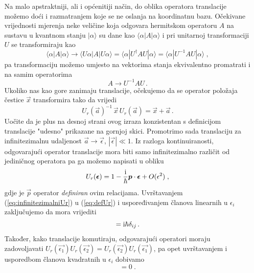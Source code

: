 Na malo apstraktniji, ali i općenitiji način, do oblika operatora translacije
možemo doći i razmatranjem koje se ne oslanja na koordinatnu bazu.
Očekivane vrijednosti mjerenja neke veličine koja odgovara hermitskom operatoru $A$
na sustavu u kvantnom stanju $|\alpha\rangle$ 
su dane kao $\langle \alpha | A | \alpha \rangle$ i pri unitarnoj transformaciji $U$
se transformiraju kao 
\begin{equation}
    \langle \alpha | A | \alpha \rangle \to
    \langle U \alpha | A | U \alpha \rangle =
    \langle \alpha | U^{\dagger} A U |  \alpha \rangle =
    \langle \alpha | U^{-1} A U |  \alpha \rangle \;,
\end{equation}
pa transformaciju možemo umjesto na vektorima stanja ekvivalentno promatrati
i na samim operatorima
\begin{equation}
    A \to U^{-1} A U \,.
\end{equation}
Ukoliko nas kao gore zanimaju translacije, očekujemo da se operator položaja
čestice $\vec{x}$ transformira tako da vrijedi
\begin{equation}
    U_{r}(\vec{a})^{-1} \,\vec{x} \, U_{r}(\vec{a}) = \vec{x} + \vec{a} \,.
   \label{eq:defUr}
\end{equation}
Uočite da je plus na desnoj strani ovog izraza konzistentan s definicijom
translacije "udesno" prikazane na gornjoj skici.
Promotrimo sada translaciju za infinitezimalnu udaljenost $\vec{a} \to \vec{\epsilon}$,
$|\vec{\epsilon}| \ll 1$.
Iz razloga kontinuiranosti, odgovarajući operator translacije mora biti
samo infinitezimalno različit od jediničnog operatora pa ga možemo
napisati u obliku
\begin{equation}
    U_{r}(\vec{\epsilon}) = 1 - \frac{\rmi}{\hbar} \vec{p}\cdot\vec{\epsilon} + O(\epsilon^2) \;,
    \label{eq:infinitezimalniUr}
\end{equation}
gdje je $\vec{p}$ operator \emph{definiran} ovim relacijama. Uvrštavanjem
(\ref{eq:infinitezimalniUr}) u (\ref{eq:defUr}) i uspoređivanjem članova
linearnih u $\epsilon_i$ zaključujemo da mora vrijediti
\begin{equation}
    [x_i, p_j] = \rmi\hbar \delta_{ij}\,.
    \label{eq:xpkomutacija}
\end{equation}
Također, kako translacije komutiraju, odgovarajući operatori moraju
zadovoljavati $U_{r}(\vec{\epsilon_1}) U_{r}(\vec{\epsilon_2}) =
U_{r}(\vec{\epsilon_2})U_{r}(\vec{\epsilon_1})$,
pa opet uvrštavanjem i usporedbom članova kvadratnih u $\epsilon_i$
dobivamo
\begin{equation}
    [p_i, p_j] = 0 \;.
    \label{eq:ppkomutacija}
\end{equation}
